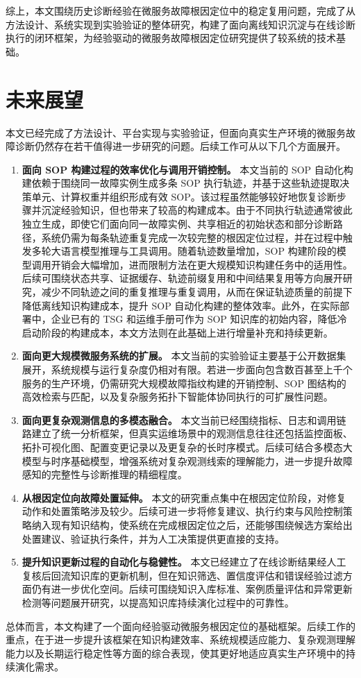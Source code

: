 综上，本文围绕历史诊断经验在微服务故障根因定位中的稳定复用问题，完成了从方法设计、系统实现到实验验证的整体研究，构建了面向离线知识沉淀与在线诊断执行的闭环框架，为经验驱动的微服务故障根因定位研究提供了较系统的技术基础。
\section{未来展望}

本文已经完成了方法设计、平台实现与实验验证，但面向真实生产环境的微服务故障诊断仍然存在若干值得进一步研究的问题。后续工作可从以下几个方面展开。

\begin{enumerate}[label=（\arabic*）]
    \item \textbf{面向 SOP 构建过程的效率优化与调用开销控制。}
    本文当前的 SOP 自动化构建依赖于围绕同一故障实例生成多条 SOP 执行轨迹，并基于这些轨迹提取决策单元、计算权重并组织形成有效 SOP。该过程虽然能够较好地恢复诊断步骤并沉淀经验知识，但也带来了较高的构建成本。由于不同执行轨迹通常彼此独立生成，即使它们面向同一故障实例、共享相近的初始状态和部分诊断路径，系统仍需为每条轨迹重复完成一次较完整的根因定位过程，并在过程中触发多轮大语言模型推理与工具调用。随着轨迹数量增加，SOP 构建阶段的模型调用开销会大幅增加，进而限制方法在更大规模知识构建任务中的适用性。后续可围绕状态共享、证据缓存、轨迹前缀复用和中间结果复用等方向展开研究，减少不同轨迹之间的重复推理与重复调用，从而在保证轨迹质量的前提下降低离线知识构建成本，提升 SOP 自动化构建的整体效率。此外，在实际部署中，企业已有的 TSG 和运维手册可作为 SOP 知识库的初始内容，降低冷启动阶段的构建成本，本文方法则在此基础上进行增量补充和持续更新。

    \item \textbf{面向更大规模微服务系统的扩展。}
    本文当前的实验验证主要基于公开数据集展开，系统规模与运行复杂度仍相对有限。若进一步面向包含数百甚至上千个服务的生产环境，仍需研究大规模故障指纹构建的开销控制、SOP 图结构的高效检索与匹配，以及复杂服务拓扑下智能体协同执行的可扩展性问题。

    \item \textbf{面向更复杂观测信息的多模态融合。}
    本文当前已经围绕指标、日志和调用链路建立了统一分析框架，但真实运维场景中的观测信息往往还包括监控面板、拓扑可视化图、配置变更记录以及更复杂的长时序模式。后续可结合多模态大模型与时序基础模型，增强系统对复杂观测线索的理解能力，进一步提升故障感知的完整性与诊断推理的精细程度。

    \item \textbf{从根因定位向故障处置延伸。}
    本文的研究重点集中在根因定位阶段，对修复动作和处置策略涉及较少。后续可进一步将修复建议、执行约束与风险控制策略纳入现有知识结构，使系统在完成根因定位之后，还能够围绕候选方案给出处置建议、验证执行条件，并为人工决策提供更直接的支持。

    \item \textbf{提升知识更新过程的自动化与稳健性。}
    本文已经建立了在线诊断结果经人工复核后回流知识库的更新机制，但在知识筛选、置信度评估和错误经验过滤方面仍有进一步优化空间。后续可围绕知识入库标准、案例质量评估和异常更新检测等问题展开研究，以提高知识库持续演化过程中的可靠性。
\end{enumerate}

总体而言，本文构建了一个面向经验驱动微服务根因定位的基础框架。后续工作的重点，在于进一步提升该框架在知识构建效率、系统规模适应能力、复杂观测理解能力以及长期运行稳定性等方面的综合表现，使其更好地适应真实生产环境中的持续演化需求。